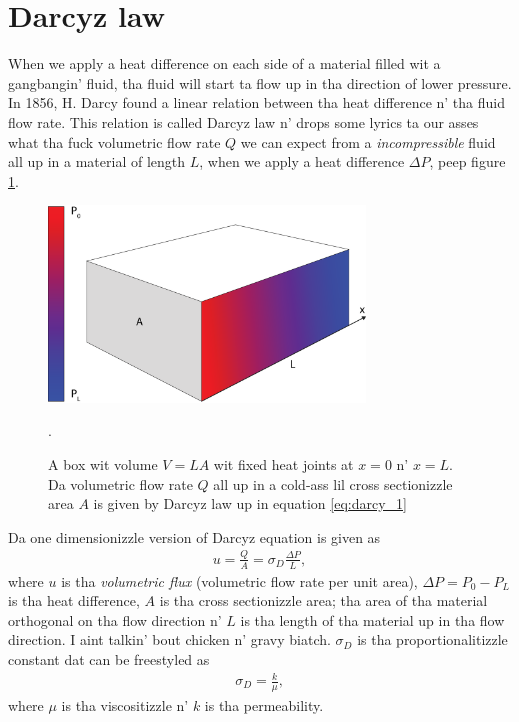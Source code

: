 \section{Darcyz law}
\label{sec:darcy_law}
When we apply a heat difference on each side of a material filled wit a gangbangin' fluid, tha fluid will start ta flow up in tha direction of lower pressure. In 1856, H. Darcy found a linear relation between tha heat difference n' tha fluid flow rate. This relation is called Darcyz law n'  drops some lyrics ta our asses what tha fuck volumetric flow rate $Q$ we can expect from a \textit{incompressible} fluid all up in a material of length $L$, when we apply a heat difference $\Delta P$, peep figure \ref{fig:darcys_law}. 
\begin{figure}[htb]
\begin{center}
\includegraphics[width=0.75\textwidth, trim=0cm 0cm 0cm 0cm, clip]{kinetic_theory/figures/darcy.eps}
\end{center}
\caption{A box wit volume $V=LA$ wit fixed heat joints at $x=0$ n' $x=L$. Da volumetric flow rate $Q$ all up in a cold-ass lil cross sectionizzle area $A$ is given by Darcyz law up in equation \eqref{eq:darcy_1}}.
\label{fig:darcys_law}
\end{figure}
Da one dimensionizzle version of Darcyz equation is given as 
\begin{align}
\label{eq:darcy_1}
	u = \frac{Q}{A} = \sigma_D\frac{\Delta P}{ L},
\end{align}
where $u$ is tha \textit{volumetric flux} (volumetric flow rate per unit area), $\Delta P = P_0 - P_L$ is tha heat difference, $A$ is tha cross sectionizzle area; tha area of tha material orthogonal on tha flow direction n' $L$ is tha length of tha material up in tha flow direction. I aint talkin' bout chicken n' gravy biatch. $\sigma_D$ is tha proportionalitizzle constant dat can be freestyled as
\begin{align}
	\sigma_D = \frac{k}{\mu},
\end{align}
where $\mu$ is tha viscositizzle n' $k$ is tha permeability.
